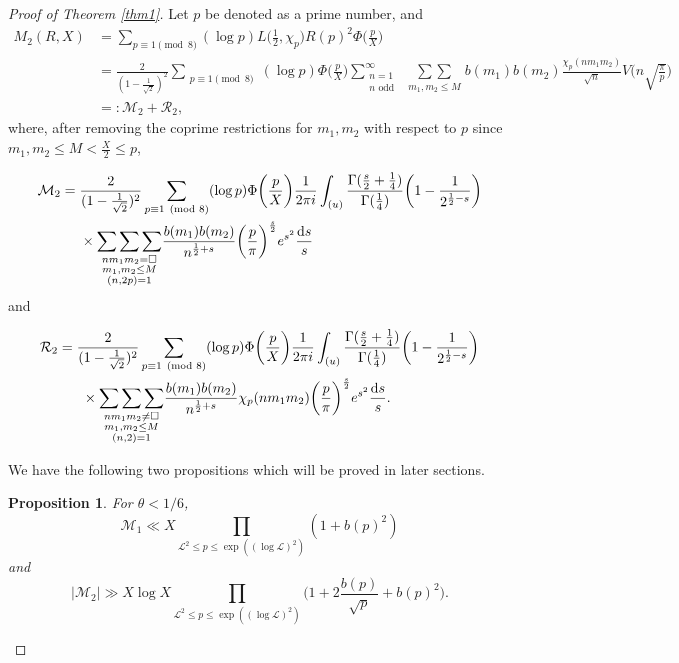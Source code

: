 \documentclass[12pt,reqno]{amsart}
\numberwithin{equation}{section}
\theoremstyle{plain}
\newtheorem{proposition}[theorem]{Proposition}
\theoremstyle{definition}
\theoremstyle{remark}
\newcommand{\dd}{\mathrm{d}}
\begin{document}
\begin{proof}[Proof of Theorem \ref{thm1}]
Let $p$ be denoted as a prime number,
and
\begin{align*}
  M_2(R,X)
  &=\sum_{p\equiv 1\pmod 8 }
  (\log p) L\bigg(\frac{1}{2},\chi_p\bigg)R(p)^2 \Phi\bigg(\frac{p}{X}\bigg)\\
  &=\frac{2}{(1-\frac{1}{\sqrt{2}})^{2}}
  \sum_{\substack{p\equiv 1\pmod 8 }}
  (\log p)\Phi\bigg(\frac{p}{X}\bigg)
  \sum_{\substack{n=1 \\ n \textrm{ odd }}}^\infty
  \underset{\substack{m_1,m_2\leq M}}{\sum\sum}b(m_1)b(m_2)
  \frac{\chi_p(nm_1m_2)}{\sqrt{n}}
  V\bigg(n\sqrt{\frac{\pi}{p}}\bigg) \\
  &=:\mathcal{M}_2+\mathcal{R}_2,
\end{align*}
where,
after removing the coprime restrictions for $m_1,m_2$ with respect to $p$ since $m_1,m_2\le M<\frac{X}{2}\le p$,

\begin{equation*}
\begin{split}
  &\mathcal{M}_2=\frac{2}{(1-\frac{1}{\sqrt{2}})^{2} }
  \sum_{p\equiv 1\pmod 8 }
  (\log p)\Phi\bigg(\frac{p}{X}\bigg)
  \frac{1}{2\pi i}
  \int_{(u)}
\frac{\Gamma(\frac{s}{2}+\frac{1}{4})}
{\Gamma(\frac{1}{4})}
\bigg(1-\frac{1}{2^{\frac{1}{2}-s}}\bigg)\\
&\hskip 30pt\times
  \underset{\substack{nm_1m_2=\square\\
  m_1,m_2\leq M\\(n,2p)=1}}{\sum\sum\sum}
\frac{b(m_1)b(m_2)}
{n^{\frac{1}{2}+s}}
\bigg(\frac{p}{\pi}\bigg)^{\frac{s}{2}}
e^{s^2}\frac{\dd s}{s}
\end{split}
\end{equation*}
and

\begin{equation*}
\begin{split}
  &\mathcal{R}_2=\frac{2}{(1-\frac{1}{\sqrt{2}})^{2} }
  \sum_{p\equiv 1\pmod 8 }
  (\log p)\Phi\bigg(\frac{p}{X}\bigg)
  \frac{1}{2\pi i}
  \int_{(u)}
\frac{\Gamma(\frac{s}{2}+\frac{1}{4})}
{\Gamma(\frac{1}{4})}
\bigg(1-\frac{1}{2^{\frac{1}{2}-s}}\bigg)\\
&\hskip 30pt\times
  \underset{\substack{nm_1m_2\neq \square\\
  m_1,m_2\leq M\\(n,2)=1}}{\sum\sum\sum}
\frac{b(m_1)b(m_2)}
{n^{\frac{1}{2}+s}}\chi_p(nm_1m_2)
\bigg(\frac{p}{\pi}\bigg)^{\frac{s}{2}}
e^{s^2}\frac{\dd s}{s}.
\end{split}
\end{equation*}

We have the following two propositions which will be proved in later sections.
\begin{proposition}\label{prop:Mi}
For $\theta< 1/6$,
  \begin{equation*}
  \mathcal{M}_1\ll X\prod_{\mathcal{L}^2\leq p \leq \exp((\log \mathcal{L})^2)}
(1+ b(p)^2)
\end{equation*}
and
\begin{equation*}
   |\mathcal{M}_2|\gg
   X\log X \prod_{\mathcal{L}^2\leq p \leq \exp((\log \mathcal{L})^2)}
  \bigg(1+2\frac{b(p)}{\sqrt{p}}+b(p)^2\bigg).
\end{equation*}
\end{proposition}


\end{proof}
\end{document}
